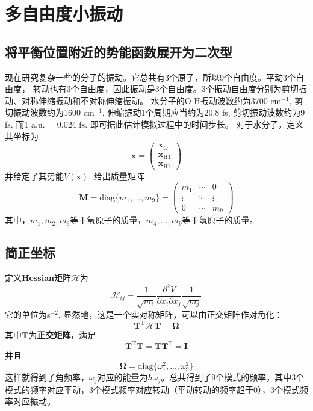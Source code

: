 \chapter{多自由度小振动}
    \section{将平衡位置附近的势能函数展开为二次型}
    现在研究复杂一些的分子的振动。它总共有3个原子，所以9个自由度。平动3个自由度，
    转动也有3个自由度，因此振动是3个自由度。3个振动自由度分别为剪切振动、对称伸缩振动和不对称伸缩振动。
    水分子的O-H振动波数约为3700 cm$^{-1}$, 剪切振动波数约为1600 cm$^{-1}$, 
    伸缩振动1个周期应当约为20.8 fs, 剪切振动波数约为9 fs. 而1 a.u. = 0.024 fs.
    即可据此估计模拟过程中的时间步长。
    对于水分子，定义其坐标为
    \begin{equation*}
        \bm{x} = 
        \begin{pmatrix}
            \bm{x}_\mathrm{O}\\
            \bm{x}_{\mathrm{H1}}\\
            \bm{x}_{\mathrm{H2}}
        \end{pmatrix}
    \end{equation*}
    并给定了其势能$V(\bm{x})$, 给出质量矩阵
    \begin{equation*}
        \bm{M} = \mathrm{diag} \{m_1,...,m_9 \} = 
        \begin{pmatrix}
            m_1 & \cdots & 0\\
            \vdots & \ddots & \vdots\\
            0 & \cdots & m_9
        \end{pmatrix}
    \end{equation*}
    其中，$m_1,m_2,m_3$等于氧原子的质量，$m_4,...,m_9$等于氢原子的质量。

    \section{简正坐标}
    定义\textbf{Hessian}矩阵$\bm{\mathcal{H}}$为 
    \begin{equation*}
        \bm{\mathcal{H}}_{ij} = \frac 1{\sqrt{m_i}} \frac {\partial^2 V}{\partial x_i \partial x_j} \frac 1{\sqrt{m_j}}
    \end{equation*}
    它的单位为s$^{-2}$. 显然地，这是一个实对称矩阵，可以由正交矩阵作对角化：
    \begin{equation*}
        \bm{T}^\mathrm{T} \bm{\mathcal{H}T = \Omega}
    \end{equation*}
    其中$\bm{T}$为\textbf{正交矩阵}，满足 
    \begin{equation*}
        \bm{T}^\mathrm{T}\bm{T} = \bm{TT}^\mathrm{T} = \bm{I}
    \end{equation*}
    并且
    \begin{equation*}
        \bm{\Omega} = \mathrm{diag} \{\omega_1^2, ..., \omega_9^2 \}
    \end{equation*}
    这样就得到了角频率，$\omega_j$对应的能量为$\hbar \omega_j$。总共得到了9个模式的频率，其中3个模式的频率对应平动，3个模式频率对应转动（平动转动的频率趋于0），3个模式频率对应振动。

